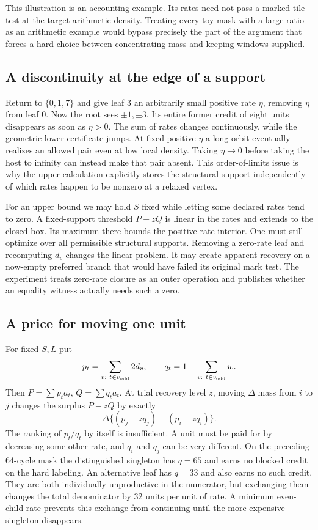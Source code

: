 \documentclass[12pt,letterpaper]{article}
\begin{document}
This illustration is an accounting example. Its rates need not pass a marked-tile test at the target arithmetic density. Treating every toy mask with a large ratio as an arithmetic example would bypass precisely the part of the argument that forces a hard choice between concentrating mass and keeping windows supplied.

\subsection{A discontinuity at the edge of a support}
Return to \(\{0,1,7\}\) and give leaf 3 an arbitrarily small positive rate \(\eta\), removing \(\eta\) from leaf 0. Now the root sees \(\pm1,\pm3\). Its entire former credit of eight units disappears as soon as \(\eta>0\). The sum of rates changes continuously, while the geometric lower certificate jumps. At fixed positive \(\eta\) a long orbit eventually realizes an allowed pair even at low local density. Taking \(\eta\to0\) before taking the host to infinity can instead make that pair absent. This order-of-limits issue is why the upper calculation explicitly stores the structural support independently of which rates happen to be nonzero at a relaxed vertex.

For an upper bound we may hold \(S\) fixed while letting some declared rates tend to zero. A fixed-support threshold \(P-zQ\) is linear in the rates and extends to the closed box. Its maximum there bounds the positive-rate interior. One must still optimize over all permissible structural supports. Removing a zero-rate leaf and recomputing \(d_v\) changes the linear problem. It may create apparent recovery on a now-empty preferred branch that would have failed its original mark test. The experiment treats zero-rate closure as an outer operation and publishes whether an equality witness actually needs such a zero.

\subsection{A price for moving one unit}
For fixed \(S,L\) put
\[
 p_t=\sum_{v:\ t\in v_{\rm odd}}2d_v,\qquad
 q_t=1+\sum_{v:\ t\in v_{\rm odd}}w.
\]
Then \(P=\sum p_ta_t\), \(Q=\sum q_ta_t\). At trial recovery level \(z\), moving \(\Delta\) mass from \(i\) to \(j\) changes the surplus \(P-zQ\) by exactly
\[
 \Delta\{(p_j-zq_j)-(p_i-zq_i)\}.
\]
The ranking of \(p_t/q_t\) by itself is insufficient. A unit must be paid for by decreasing some other rate, and \(q_i\) and \(q_j\) can be very different. On the preceding 64-cycle mask the distinguished singleton has \(q=65\) and earns no blocked credit on the hard labeling. An alternative leaf has \(q=33\) and also earns no such credit. They are both individually unproductive in the numerator, but exchanging them changes the total denominator by 32 units per unit of rate. A minimum even-child rate prevents this exchange from continuing until the more expensive singleton disappears.
\end{document}
